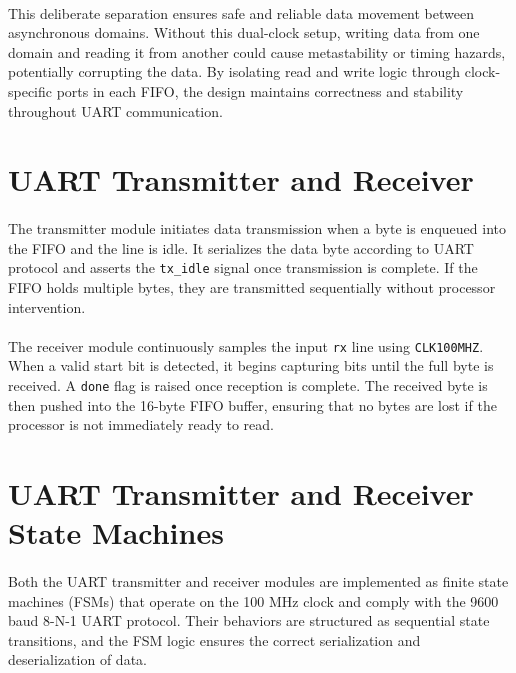 \documentclass[12pt]{report}
\begin{document}
\paragraph{}
This deliberate separation ensures safe and reliable data movement between asynchronous domains. Without this dual-clock setup, writing data from one domain and reading it from another could cause metastability or timing hazards, potentially corrupting the data. By isolating read and write logic through clock-specific ports in each FIFO, the design maintains correctness and stability throughout UART communication.


\section{UART Transmitter and Receiver}

\paragraph{}
The transmitter module initiates data transmission when a byte is enqueued into the FIFO and the line is idle. It serializes the data byte according to UART protocol and asserts the \texttt{tx\_idle} signal once transmission is complete. If the FIFO holds multiple bytes, they are transmitted sequentially without processor intervention.

\paragraph{}
The receiver module continuously samples the input \texttt{rx} line using \texttt{CLK100MHZ}. When a valid start bit is detected, it begins capturing bits until the full byte is received. A \texttt{done} flag is raised once reception is complete. The received byte is then pushed into the 16-byte FIFO buffer, ensuring that no bytes are lost if the processor is not immediately ready to read.

\section{UART Transmitter and Receiver State Machines}

\paragraph{}
Both the UART transmitter and receiver modules are implemented as finite state machines (FSMs) that operate on the 100 MHz clock and comply with the 9600 baud 8-N-1 UART protocol. Their behaviors are structured as sequential state transitions, and the FSM logic ensures the correct serialization and deserialization of data.
\end{document}

